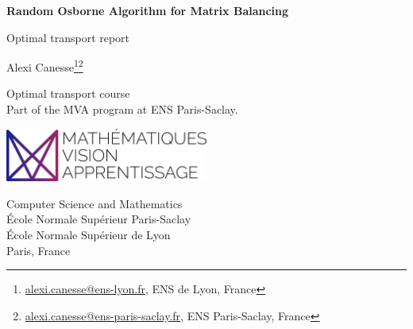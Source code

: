 \renewcommand{\today}{\number\day\textsuperscript{\scriptsize\text{th}} \DTMenglishmonthname{\month} \number\year}


\makeatletter
\newcommand\setxveclength[5]{%
    \pgfpointdiff{#2}{#3}
    \edef#1{\the\pgf@x}
}
\makeatother

\sloppy                  

\pgfplotsset{compat=1.16}








\begin{titlepage}
    \begin{center}
        \vspace*{1cm}
            
        \Huge
        \textbf{Random Osborne Algorithm for Matrix Balancing}
            
        \vspace{0.5cm}
        \LARGE
        Optimal transport report
            
        \vspace{2.5cm}
            
        \huge {\sc Alexi Canesse\footnote{\href{mailto:alexi.canesse@ens-lyon.fr}{alexi.canesse@ens-lyon.fr}, ENS de Lyon, France}\footnote{\href{mailto:alexi.canesse@ens-paris-saclay.fr}{alexi.canesse@ens-paris-saclay.fr}, ENS Paris-Saclay, France}}\\\Large
            
        \vfill

        Optimal transport course\\
        Part of the MVA program at ENS Paris-Saclay.
            
        \vspace{2cm}
        \includegraphics[width=0.5\textwidth]{./figures/logo.pdf}
        \vspace{2cm}

        \Large
        Computer Science and Mathematics\\
        École Normale Supérieur Paris-Saclay\\
        École Normale Supérieur de Lyon\\
        Paris, France\\
        \today
            
    \end{center}
\end{titlepage}





